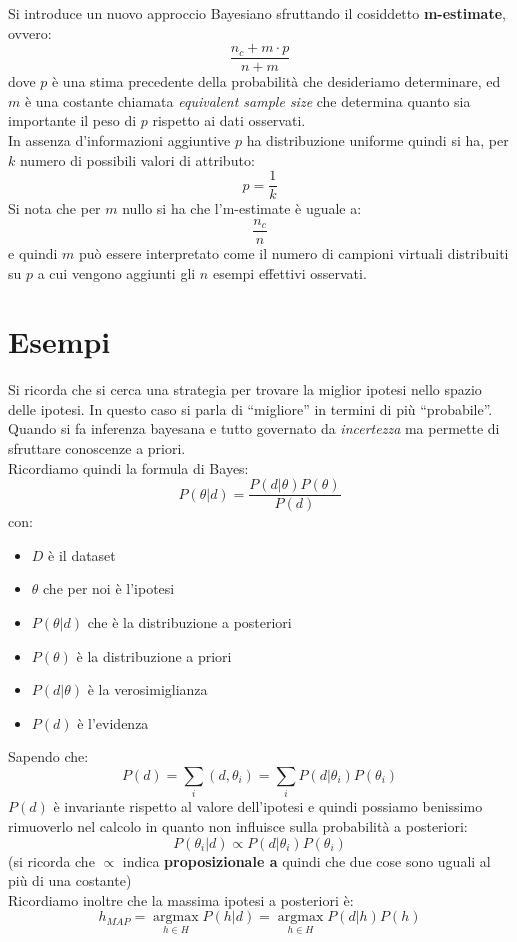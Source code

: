 Si introduce un nuovo approccio Bayesiano sfruttando il cosiddetto
\textbf{m-estimate}, ovvero: 
\[\frac{n_c+m\cdot p}{n+m}\]
dove $p$ è una stima precedente della probabilità che desideriamo determinare,
ed $m$ è una costante chiamata \textit{equivalent sample size} che determina
quanto sia importante il peso di $p$ rispetto ai dati osservati.\\
In assenza d'informazioni aggiuntive $p$ ha distribuzione uniforme quindi si
ha, per $k$ numero di possibili valori di attributo:
\[p=\frac{1}{k}\]
Si nota che per $m$ nullo si ha che l'm-estimate è uguale a:
\[\frac{n_c}{n}\]
e quindi $m$ può essere interpretato come il numero di campioni virtuali
distribuiti su $p$ a cui vengono aggiunti gli $n$ esempi effettivi osservati.
\section{Esempi}
Si ricorda che si cerca una strategia per trovare la miglior ipotesi nello
spazio delle ipotesi. In questo caso si parla di ``migliore'' in termini di più
``probabile''. \\
Quando si fa inferenza bayesana e tutto governato da \textit{incertezza} ma
permette di sfruttare conoscenze a priori.\\
Ricordiamo quindi la formula di Bayes:
\[P(\theta|d)=\frac{P(d|\theta)P(\theta)}{P(d)}\]
con:
\begin{itemize}
  \item $D$ è il dataset
  \item $\theta$ che per noi è l'ipotesi
  \item $P(\theta|d)$ che è la distribuzione a posteriori
  \item $P(\theta)$ è la distribuzione a priori
  \item $P(d|\theta)$ è la verosimiglianza
  \item $P(d)$ è l'evidenza
\end{itemize}
Sapendo che:
\[P(d)=\sum_i(d, \theta_i)=\sum_i P(d|\theta_i)P(\theta_i)\]
$P(d)$ è invariante rispetto al valore dell'ipotesi e quindi possiamo benissimo
rimuoverlo nel calcolo in quanto non influisce sulla probabilità a posteriori:
\[P(\theta_i|d)\varpropto P(d|\theta_i)P(\theta_i)\]
(si ricorda che $\varpropto$ indica \textbf{proposizionale a} quindi che due
cose sono uguali al più di una costante)\\
Ricordiamo inoltre che la massima ipotesi a posteriori è:
\[h_{MAP}=\operatorname*{argmax}_{h\in H}P(h|d)=
  \operatorname*{argmax}_{h\in H}P(d|h)P(h)\]
